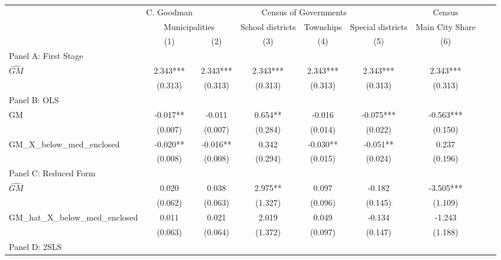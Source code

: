  \begin{tabular}{l*{8}{c}} \toprule
&\multicolumn{1}{c}{C. Goodman}&\multicolumn{4}{c}{Census of Governments}&\multicolumn{1}{c}{Census}\\\cmidrule(lr){2-2}\cmidrule(lr){3-6}\cmidrule(lr){7-7}
&\multicolumn{2}{c}{Municipalities}&\multicolumn{1}{c}{School districts}&\multicolumn{1}{c}{Townships}&\multicolumn{1}{c}{Special districts}&\multicolumn{1}{c}{Main City Share}\\\cmidrule(lr){2-3}\cmidrule(lr){4-6}\cmidrule(lr){7-7}
&\multicolumn{1}{c}{(1)}&\multicolumn{1}{c}{(2)}&\multicolumn{1}{c}{(3)}&\multicolumn{1}{c}{(4)}&\multicolumn{1}{c}{(5)}&\multicolumn{1}{c}{(6)}\\
\cmidrule(lr){1-7}
\multicolumn{6}{l}{Panel A: First Stage}\\
\cmidrule(lr){1-7}
$\widehat{GM}$  &    2.343***&    2.343***&    2.343***&    2.343***&    2.343***&    2.343***\\
                &  (0.313)   &  (0.313)   &  (0.313)   &  (0.313)   &  (0.313)   &  (0.313)   \\
\cmidrule(lr){1-7}
\multicolumn{6}{l}{Panel B: OLS}\\
\cmidrule(lr){1-7}
GM              &   -0.017** &   -0.011   &    0.654** &   -0.016   &   -0.075***&   -0.563***\\
                &  (0.007)   &  (0.007)   &  (0.284)   &  (0.014)   &  (0.022)   &  (0.150)   \\
\addlinespace
GM\_X\_below\_med\_enclosed&   -0.020** &   -0.016** &    0.342   &   -0.030** &   -0.051** &    0.237   \\
                &  (0.008)   &  (0.008)   &  (0.294)   &  (0.015)   &  (0.024)   &  (0.196)   \\
\cmidrule(lr){1-7}
\multicolumn{6}{l}{Panel C: Reduced Form}\\
\cmidrule(lr){1-7}
$\widehat{GM}$  &    0.020   &    0.038   &    2.975** &    0.097   &   -0.182   &   -3.505***\\
                &  (0.062)   &  (0.063)   &  (1.327)   &  (0.096)   &  (0.145)   &  (1.109)   \\
\addlinespace
GM\_hat\_X\_below\_med\_enclosed&    0.011   &    0.021   &    2.019   &    0.049   &   -0.134   &   -1.243   \\
                &  (0.063)   &  (0.064)   &  (1.372)   &  (0.097)   &  (0.147)   &  (1.188)   \\
\cmidrule(lr){1-7}
\multicolumn{6}{l}{Panel D: 2SLS}\\

\end{tabular}
